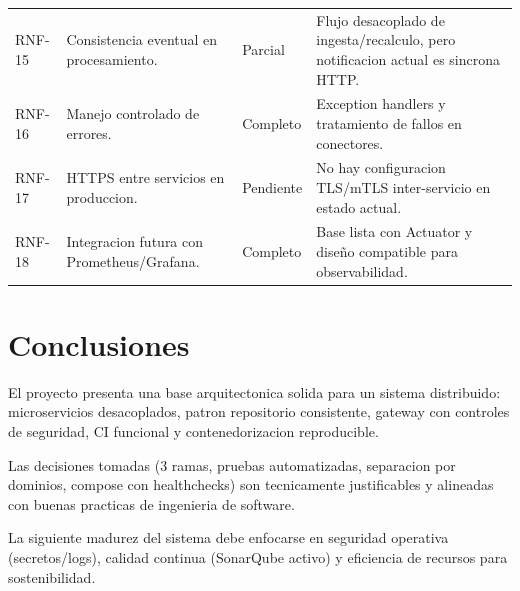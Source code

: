 \documentclass[12pt,a4paper]{article}
\begin{document}
\begin{longtable}{p{1.5cm}p{6.4cm}p{2.3cm}p{3.6cm}}
RNF-15 & Consistencia eventual en procesamiento. & Parcial & Flujo desacoplado de ingesta/recalculo, pero notificacion actual es sincrona HTTP. \\
RNF-16 & Manejo controlado de errores. & Completo & Exception handlers y tratamiento de fallos en conectores. \\
RNF-17 & HTTPS entre servicios en produccion. & Pendiente & No hay configuracion TLS/mTLS inter-servicio en estado actual. \\
RNF-18 & Integracion futura con Prometheus/Grafana. & Completo & Base lista con Actuator y diseño compatible para observabilidad. \\
\bottomrule
\end{longtable}

\section{Conclusiones}
El proyecto presenta una base arquitectonica solida para un sistema distribuido: microservicios desacoplados, patron repositorio consistente, gateway con controles de seguridad, CI funcional y contenedorizacion reproducible.

Las decisiones tomadas (3 ramas, pruebas automatizadas, separacion por dominios, compose con healthchecks) son tecnicamente justificables y alineadas con buenas practicas de ingenieria de software.

La siguiente madurez del sistema debe enfocarse en seguridad operativa (secretos/logs), calidad continua (SonarQube activo) y eficiencia de recursos para sostenibilidad.
\end{document}
